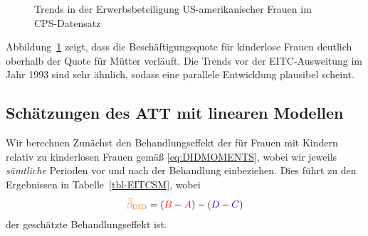 \documentclass[
  a4paper,
  DIV=11,
  oneside]{scrreprt}
\begin{document}
\begin{figure}[t]


\caption{\label{fig-EITCtrends}Trends in der Erwerbsbeteiligung
US-amerikanischer Frauen im CPS-Datensatz}

\end{figure}%

Abbildung~\ref{fig-EITCtrends} zeigt, dass die Beschäftigungsquote für
kinderlose Frauen deutlich oberhalb der Quote für Mütter verläuft. Die
Trends vor der EITC-Ausweitung im Jahr 1993 sind sehr ähnlich, sodass
eine parallele Entwicklung plausibel scheint.

\subsection{Schätzungen des ATT mit linearen
Modellen}\label{sec-didattest}

Wir berechnen Zunächst den Behandlungseffekt der für Frauen mit Kindern
relativ zu kinderlosen Frauen gemäß \eqref{eq:DIDMOMENTS}, wobei wir
jeweils \emph{sämtliche} Perioden vor und nach der Behandlung
einbeziehen. Dies führt zu den Ergebnissen in Tabelle~\ref{tbl-EITCSM},
wobei \begin{align}
  \textcolor{orange}{\widehat\beta_\text{DID}} = (\textcolor{red}{B} - \textcolor{red}{A}) - (\textcolor{blue}{D} - \textcolor{blue}{C})
\end{align} der geschätzte Behandlungseffekt ist.
\end{document}
